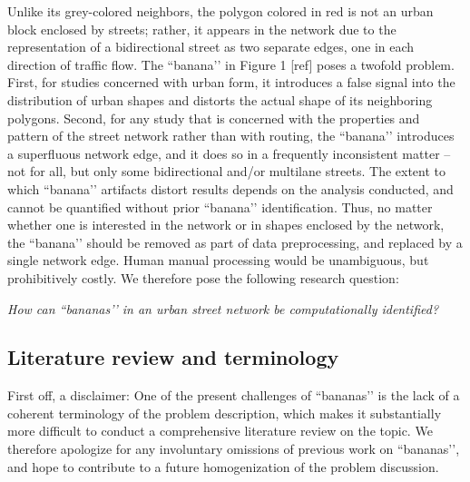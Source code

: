 Unlike its grey-colored neighbors, the polygon colored in red is not an urban block enclosed by streets; rather, it appears in the network due to the representation of a bidirectional street as two separate edges, one in each direction of traffic flow. The ``banana’’ in Figure 1 [ref] poses a twofold problem. First, for studies concerned with urban form, it introduces a false signal into the distribution of urban shapes and distorts the actual shape of its neighboring polygons. Second, for any study that is concerned with the properties and pattern of the street network rather than with routing, the ``banana’’ introduces a superfluous network edge, and it does so in a frequently inconsistent matter – not for all, but only some bidirectional and/or multilane streets. The extent to which ``banana’’ artifacts distort results depends on the analysis conducted, and cannot be quantified without prior ``banana’’ identification. Thus, no matter whether one is interested in the network or in shapes enclosed by the network, the ``banana’’ should be removed as part of data preprocessing, and  replaced by a single network edge. Human manual processing would be unambiguous, but prohibitively costly. We therefore pose the following research question:

\begin{center}
\textit{How can ``bananas’’ in an urban street network be computationally identified?}
\end{center}

\subsection*{Literature review and terminology}

First off, a disclaimer: One of the present challenges of ``bananas’’ is the lack of a coherent terminology of the problem description, which makes it substantially more difficult to conduct a comprehensive literature review on the topic. We therefore apologize for any involuntary omissions of previous work on ``bananas’’, and hope to contribute to a future homogenization of the problem discussion.

